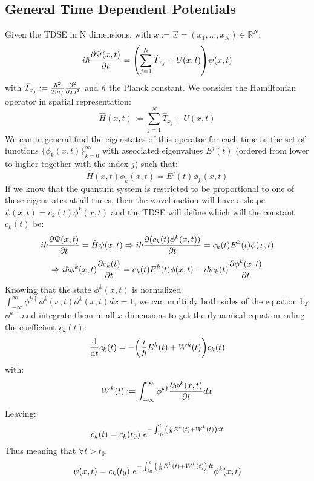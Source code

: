 \documentclass[11pt, a4paper]{article} %
\newcommand{\R}{\mathbb{R}} %
\begin{document}
\subsection{General Time Dependent Potentials}
Given the TDSE in N dimensions, with $x:=\vec{x}=(x_1,...,x_N)\in \R^N$:
\begin{equation}
i\hbar \pdv{\Psi(x,t)}{t}=\qty( \sum_{j=1}^N\hat{T}_{x_j}+U(x, t) )\psi(x,t)
\end{equation}
with $\hat{T}_{x_j}:=\frac{\hbar^2}{2m_j}\pdv[2]{}{xj}$ and $\hbar$ the Planck constant. We consider the Hamiltonian operator in spatial representation:
\begin{equation}
\hat{H}(x,t):=\sum_{j=1}^N\hat{T}_{x_j}+U(x, t)
\end{equation}
We can in general find the eigenstates of this operator for each time as the set of functions $\{\phi_k(x,t)\}_{k=0}^\infty$ with associated eigenvalues $E^j(t)$ (ordered from lower to higher together with the index $j$) such that:
\begin{equation}
\hat{H}(x,t)\phi_k(x,t)=E^j(t)\phi_k(x,t)
\end{equation}
If we know that the quantum system is restricted to be proportional to one of these eigenstates at all times, then the wavefunction will have a shape $\psi(x,t)=c_k(t)\phi^k(x,t)$ and the TDSE will define which will the constant $c_k(t)$ be:
\begin{equation}
i\hbar \pdv{\Psi(x,t)}{t}=\hat{H}\psi(x,t)\Rightarrow i\hbar \pdv{(c_k(t)\phi^k(x,t))}{t}=c_k(t)E^k(t)\phi(x,t) 
\end{equation}
$$
\Rightarrow i\hbar \phi^k(x,t)\pdv{c_k(t)}{t}=c_k(t)E^k(t)\phi(x,t)-i\hbar  c_k(t)\pdv{\phi^k(x,t)}{t}
$$
Knowing that the state $\phi^k(x,t)$ is normalized $\int_{-\infty}^\infty\phi^{k \dagger}\phi^k(x,t)\phi^k(x,t)dx=1$, we can multiply both sides of the equation by $\phi^{k \dagger}$ and integrate them in all $x$ dimensions to get the dynamical equation ruling the coefficient $c_k(t)$:
\begin{equation}
\dv{}{t}c_k(t)=-\qty(\frac{i}{\hbar}E^k(t) + W^k(t) )c_k(t)
\end{equation}
with:
\begin{equation}
W^k(t):=\int_{-\infty}^\infty\phi^{k \dagger} \pdv{\phi^k(x,t)}{t} dx
\end{equation}
Leaving:
\begin{equation}
c_k(t)=c_k(t_0)\ e^{-\int_{t_0}^t \qty(\frac{i}{\hbar}E^k(t) + W^k(t) )dt}
\end{equation}
Thus meaning that $\forall t>t_0$:
$$
\psi(x,t)=c_k(t_0)\ e^{-\int_{t_0}^t \qty(\frac{i}{\hbar}E^k(t) + W^k(t) )dt} \phi^k(x,t)
$$
\end{document}
